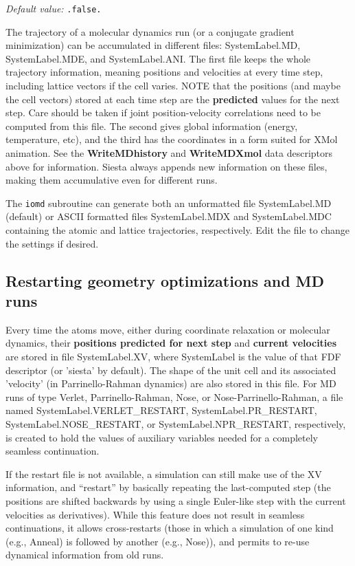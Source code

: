 \documentclass[11pt]{article}
\begin{document}
\begin{description}
{\it Default value:} {\tt .false.}


The trajectory of a molecular dynamics run (or a conjugate gradient
minimization) can be accumulated in different files: SystemLabel.MD,
SystemLabel.MDE, and SystemLabel.ANI. The first file keeps the whole
trajectory information, meaning positions and velocities at every time
step, including lattice vectors if the cell varies. NOTE that the
positions (and maybe the cell vectors) stored at each time step are
the {\bf predicted} values for the next step. Care should be taken if
joint position-velocity correlations need to be computed from this
file.  The second gives global information (energy, temperature, etc),
and the third has the coordinates in a form suited for XMol animation.
See the {\bf WriteMDhistory} and {\bf WriteMDXmol} data descriptors
above for information. {\sc Siesta} always appends new information on
these files, making them accumulative even for different runs.

The {\tt iomd} subroutine can generate both an unformatted file
SystemLabel.MD (default) or ASCII formatted files SystemLabel.MDX and
SystemLabel.MDC containing the atomic and lattice trajectories,
respectively. Edit the file to change the settings if desired.


\end{description}

\subsection{Restarting geometry optimizations and MD runs}

Every time the atoms move, either during coordinate relaxation or
molecular dynamics, their {\bf positions predicted for next step} and
{\bf current velocities} are stored in file SystemLabel.XV, where
SystemLabel is the value of that FDF descriptor (or 'siesta' by
default).  The shape of the unit cell and its associated 'velocity'
(in Parrinello-Rahman dynamics) are also stored in this file. For MD
runs of type Verlet, Parrinello-Rahman, Nose, or
Nose-Parrinello-Rahman, a file named SystemLabel.VERLET\_RESTART,
SystemLabel.PR\_RESTART, SystemLabel.NOSE\_RESTART, or
SystemLabel.NPR\_RESTART, respectively, is created to hold the values
of auxiliary variables needed for a completely seamless
continuation. 

If the restart file is not available, a simulation can still make use
of the XV information, and ``restart'' by basically repeating the
last-computed step (the positions are shifted backwards by using a
single Euler-like step with the current velocities as derivatives).
While this feature does not result in seamless continuations, it
allows cross-restarts (those in which a simulation of one kind (e.g.,
Anneal) is followed by another (e.g., Nose)), and permits 
to re-use dynamical information from old runs.
\end{document}
